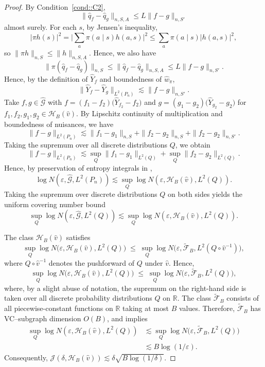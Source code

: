 \documentclass{article}
\theoremstyle{plain}
\theoremstyle{definition}
\theoremstyle{remark}
\begin{document}
\begin{proof}
 

By Condition~\ref{cond::C2},
\[
\|\hat q_f-\hat q_g\|_{n,S,A}
\le
L\|f-g\|_{n,S'}
\]
almost surely.
For each $s$, by Jensen's inequality,
\[
|\pi h(s)|^2=\Big|\sum_a \pi(a\mid s)h(a,s)\Big|^2
\le \sum_a \pi(a\mid s)|h(a,s)|^2,
\]
so $\|\pi h\|_{n,S}\le \|h\|_{n,S,A}$. Hence, we also have
\[
\|\pi(\hat q_f-\hat q_g)\|_{n,S}
\le \|\hat q_f-\hat q_g\|_{n,S,A}
\le L \|f - g\|_{n, S'} .
\]
Hence, by the definition of \(\widehat Y_f\) and boundedness of
\(\widehat w_\pi\),
\[
\|\widehat Y_f - \widehat Y_g\|_{L^2(P_n)} 
\lesssim  
\|f - g\|_{n,S'}.
\]
Take $f, g \in \widehat{\mathcal{G}}$ with 
$f = (f_1 - f_2)\big(\widehat Y_{f_2} - f_2\big)$ 
and 
$g = (g_1 - g_2)\big(\widehat Y_{g_2} - g_2\big)$ 
for $f_1, f_2, g_1, g_2 \in \mathcal H_B(\hat v)$. 
By Lipschitz continuity of multiplication and boundedness of nuisances, we have
\[
\|f - g\|_{L^2(P_n)} 
\lesssim  
\|f_1 - g_1\|_{n, S} + \|f_2 - g_2\|_{n, S}+ \|f_2 - g_2\|_{n, S'}.
\]
Taking the supremum over all discrete distributions $Q$, we obtain
\[
\|f - g\|_{L^2(P_n)} 
\lesssim  
\sup_Q \|f_1 - g_1\|_{L^2(Q)} 
+ \sup_Q \|f_2 - g_2\|_{L^2(Q)} .
\]
Hence, by preservation of entropy integrals in \citet{van1996weak},
\[
\log N(\varepsilon, \widehat{\mathcal{G}}, L^2(P_n)) 
\lesssim 
\sup_Q \log N(\varepsilon, \mathcal H_B(\hat v), L^2(Q)) .
\]
Taking the supremum over discrete distributions $Q$ on both sides yields the uniform covering number bound
\[
\sup_Q \log N(\varepsilon, \widehat{\mathcal{G}}, L^2(Q)) 
\lesssim 
\sup_Q \log N(\varepsilon, \mathcal H_B(\hat v), L^2(Q)) .
\]


The class \(\mathcal H_B(\hat v)\) satisfies
\[
\sup_Q \log N\big(\varepsilon, \mathcal H_B(\hat v), L^2(Q)\big)
\;\le\;
\sup_{Q} \log N\big(\varepsilon, \widetilde{\mathcal{F}}_{B},
L^2(Q \circ \hat{v}^{-1})\big),
\]
where \(Q \circ \hat{v}^{-1}\) denotes the pushforward of \(Q\) under
\(\hat{v}\). Hence,
\[
\sup_Q \log N\big(\varepsilon, \mathcal H_B(\hat v), L^2(Q)\big)
\;\le\;
\sup_{Q} \log N\big(\varepsilon, \widetilde{\mathcal{F}}_{B}, L^2(Q)\big),
\]
where, by a slight abuse of notation, the supremum on the right-hand side is
taken over all discrete probability distributions \(Q\) on \(\mathbb{R}\).
The class \(\widetilde{\mathcal{F}}_{B}\) consists of all piecewise-constant
functions on \(\mathbb{R}\) taking at most \(B\) values. Therefore,
\(\widetilde{\mathcal{F}}_{B}\) has VC--subgraph dimension \(O(B)\), and
\citet{van1996weak} implies
\begin{align*}
    \sup_Q \log N(\varepsilon, \mathcal H_B(\hat v), L^2(Q))
&\lesssim
\sup_{Q} \log N\big(\varepsilon, \widetilde{\mathcal{F}}_{B}, L^2(Q)\big)\\
&\lesssim B \log(1/\varepsilon).
\end{align*}
 Consequently, $\mathcal{J}(\delta, \mathcal H_B(\hat v))
\lesssim \delta \sqrt{B \log(1/\delta)}$.
\end{proof}
\end{document}
